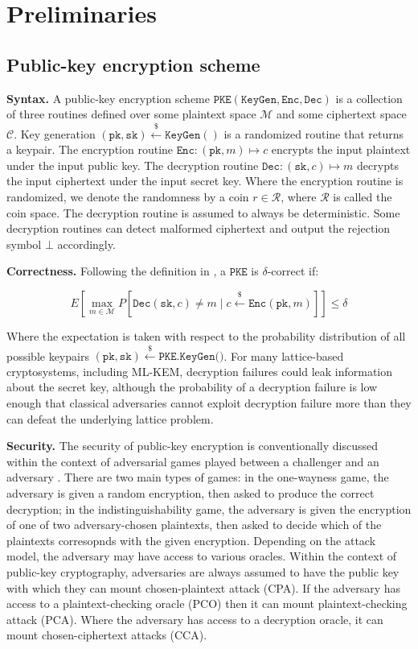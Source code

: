 \documentclass[journal=tches,submission]{iacrtrans}
\newcommand{\pke}{\texttt{PKE}}
\newcommand{\keygen}{\texttt{KeyGen}}
\newcommand{\encrypt}{\texttt{Enc}}
\newcommand{\decrypt}{\texttt{Dec}}
\newcommand{\pk}{\texttt{pk}}
\newcommand{\sk}{\texttt{sk}}
\newcommand{\leftsample}{\stackrel{\$}{\leftarrow}}
\begin{document}
\section{Preliminaries}\label{sec:preliminaries}

\subsection{Public-key encryption scheme}
\textbf{Syntax.} A public-key encryption scheme $\pke(\keygen, \encrypt, \decrypt)$ is a collection of three routines defined over some plaintext space $\mathcal{M}$ and some ciphertext space $\mathcal{C}$. Key generation $(\pk, \sk) \leftsample \keygen()$ is a randomized routine that returns a keypair. The encryption routine $\encrypt: (\pk, m) \mapsto c$ encrypts the input plaintext under the input public key. The decryption routine $\decrypt: (\sk, c) \mapsto m$ decrypts the input ciphertext under the input secret key. Where the encryption routine is randomized, we denote the randomness by a coin $r \in \mathcal{R}$, where $\mathcal{R}$ is called the coin space. The decryption routine is assumed to always be deterministic. Some decryption routines can detect malformed ciphertext and output the rejection symbol $\bot$ accordingly.

\textbf{Correctness.} Following the definition in \cite{DBLP:conf/eurocrypt/DworkNR04}, a $\pke$ is $\delta$-correct if:

\begin{equation*}
    E\left[\max_{m \in \mathcal{M}} P\left[\decrypt(\sk, c) \neq m \mid c \leftsample \encrypt(\pk, m)\right]\right] \leq \delta
\end{equation*}

Where the expectation is taken with respect to the probability distribution of all possible keypairs $(\pk, \sk) \leftsample \texttt{PKE.KeyGen()}$. For many lattice-based cryptosystems, including ML-KEM, decryption failures could leak information about the secret key, although the probability of a decryption failure is low enough that classical adversaries cannot exploit decryption failure more than they can defeat the underlying lattice problem.

\textbf{Security.} The security of public-key encryption is conventionally discussed within the context of adversarial games played between a challenger and an adversary \cite{DBLP:conf/stoc/GoldwasserM82}. There are two main types of games: in the one-wayness game, the adversary is given a random encryption, then asked to produce the correct decryption; in the indistinguishability game, the adversary is given the encryption of one of two adversary-chosen plaintexts, then asked to decide which of the plaintexts corresopnds with the given encryption. Depending on the attack model, the adversary may have access to various oracles. Within the context of public-key cryptography, adversaries are always assumed to have the public key with which they can mount chosen-plaintext attack (CPA). If the adversary has access to a plaintext-checking oracle (PCO) \cite{DBLP:conf/ctrsa/OkamotoP01} then it can mount plaintext-checking attack (PCA). Where the adversary has access to a decryption oracle, it can mount chosen-ciphertext attacks (CCA). 
\end{document}

